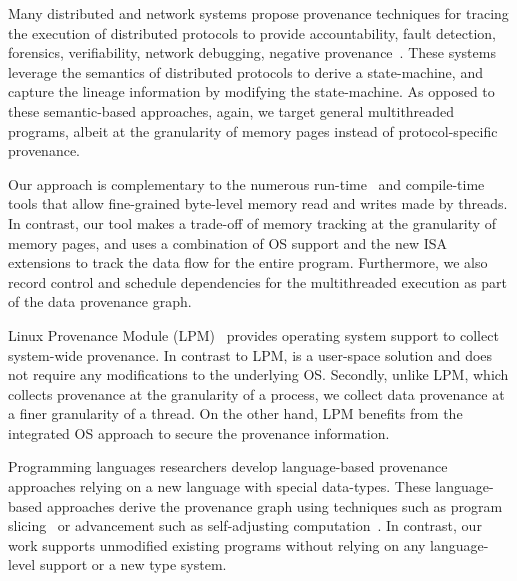  Many distributed and network systems propose provenance techniques for tracing the  execution of distributed protocols to provide accountability, fault detection, forensics, verifiability, network debugging, negative provenance~\cite{snp}. %
These systems leverage the semantics of distributed protocols to derive a state-machine, and capture the lineage information by modifying the state-machine. 
 As opposed to these semantic-based approaches, again, we target general multithreaded programs, albeit at the granularity of memory pages instead of protocol-specific provenance.



 Our approach is complementary to the numerous run-time~\cite{valgrind,memtrace} and compile-time~\cite{cgo-compiler-provenance} tools that allow fine-grained byte-level memory read and writes made by threads. In contrast, our tool makes a trade-off of memory tracking at the granularity of memory pages, and uses a combination of OS support and the new ISA extensions to track the data flow for the entire program. Furthermore, we also record control and schedule dependencies for the multithreaded execution as part of the data provenance graph. 


 Linux Provenance Module (LPM)~\cite{lpm} provides operating system support to collect system-wide provenance. In contrast to LPM, \projecttitle is a user-space solution and does not require any modifications to the underlying OS. Secondly, unlike LPM, which collects provenance at the granularity of a process, we collect data provenance at a finer granularity of a thread.  On the other hand, LPM benefits from the integrated OS approach to secure the provenance information. 

 Programming languages researchers develop language-based provenance approaches relying on a new language with special data-types. These language-based approaches derive the provenance graph using techniques such as  program slicing~\cite{roly} or advancement such as self-adjusting computation~\cite{Acar05}. In contrast, our work supports unmodified existing programs without relying on any language-level support or a new type system.



